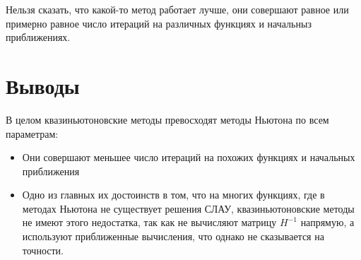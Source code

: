 \documentclass[english]{article}
\begin{document}
Нельзя сказать, что какой-то метод работает лучше, они совершают
равное или примерно равное число итераций на различных функциях и
начальныз приближениях.
\section{Выводы}
В целом квазиньютоновские методы превосходят методы Ньютона по всем параметрам:
\begin{itemize}
\item Они совершают меньшее число итераций на похожих функциях и начальных приближения
\item Одно из главных их достоинств в том, что на многих функциях, где
  в методах Ньютона не существует решения СЛАУ, квазиньютоновские
  методы не имеют этого недостатка, так как не вычисляют матрицу
  \(H^{-1}\) напрямую, а используют приближенные вычисления, что
  однако не сказывается на точности.
\end{itemize}
\end{document}
